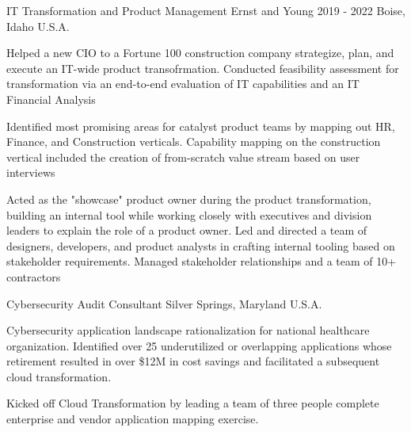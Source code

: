 \begin{cventries}
  \cventry
    {IT Transformation and Product Management} %
    {Ernst and Young} %
    {2019 - 2022} %
    {Boise, Idaho U.S.A.} %
    {
      \begin{cvitems} %
        \item {Helped a new CIO to a Fortune 100 construction company strategize, plan, and execute an IT-wide product transofrmation. Conducted feasibility assessment for transformation via an end-to-end evaluation of IT capabilities and an IT Financial Analysis}
        \item {Identified most promising areas for catalyst product teams by mapping out HR, Finance, and Construction verticals. Capability mapping on the construction vertical included the creation of from-scratch value stream based on user interviews}
        \item {Acted as the "showcase" product owner during the product transformation, building an internal tool while working closely with executives and division leaders to explain the role of a product owner. Led and directed a team of designers, developers, and product analysts in crafting internal tooling based on stakeholder requirements. Managed stakeholder relationships and a team of 10+ contractors}
      \end{cvitems}
    }

  \cventry
    {Cybersecurity Audit Consultant} %
    {} %
    {} %
    {Silver Springs, Maryland U.S.A.} %
    {
      \begin{cvitems} %
        \item {Cybersecurity application landscape rationalization for national healthcare organization. Identified over 25 underutilized or overlapping applications whose retirement resulted in over \$12M in cost savings and facilitated a subsequent cloud transformation.}
        \item {Kicked off Cloud Transformation by leading a team of three people complete enterprise and vendor application mapping exercise. }
      \end{cvitems}
    }


\end{cventries}
